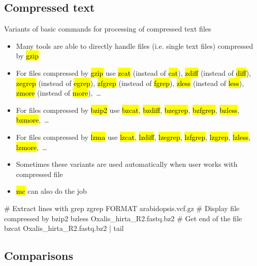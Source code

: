 \documentclass[compress, ucs, xelatex, 11pt, xcolor=svgnames, aspectratio=169,
	hyperref={
		bookmarks=true,
		unicode=true,
		colorlinks=true,
		pdftitle={Linux, command line and MetaCentrum},
		plainpages=false,
		pdfauthor={Vojtech Zeisek},
		pdfsubject={Course about use of Linux command line, writing shell scripts and using MetaCentrum of CESNET},
		pdfcreator={XeLaTeX},
		pdfkeywords={Linux, GNU, BASH, shell, command line, MetaCentrum},
		linkcolor=DarkRed, %
		anchorcolor=DarkBlue, %
		citecolor=Indigo, %
		filecolor=NavyBlue, %
		menucolor=DarkMagenta, %
		urlcolor=DarkBlue, %
		pdftex},
	url={hyphens, lowtilde} %
	]{beamer}
\renewcommand{\texttt}[1]{\hl{\ttfamily #1}}
\begin{document}
\subsection{Compressed text}

\begin{frame}[fragile]{Variants of basic commands for processing of compressed text files}
	\begin{itemize}
		\item Many tools are able to directly handle files (i.e. single text files) compressed by \texttt{gzip}
		\item For files compressed by \texttt{gzip} use \texttt{zcat} (instead of \texttt{cat}), \texttt{zdiff} (instead of \texttt{diff}), \texttt{zegrep} (instead of \texttt{egrep}), \texttt{zfgrep} (instead of \texttt{fgrep}), \texttt{zless} (instead of \texttt{less}), \texttt{zmore} (instead of \texttt{more}),~\ldots
		\item For files compressed by \texttt{bzip2} use \texttt{bzcat}, \texttt{bzdiff}, \texttt{bzegrep}, \texttt{bzfgrep}, \texttt{bzless}, \texttt{bzmore},~\ldots
		\item For files compressed by \texttt{lzma} use \texttt{lzcat}, \texttt{lzdiff}, \texttt{lzegrep}, \texttt{lzfgrep}, \texttt{lzgrep}, \texttt{lzless}, \texttt{lzmore},~\ldots
		\item Sometimes these variants are used automatically when user works with compressed file
		\item \texttt{mc} can also do the job
	\end{itemize}
	\vfill
	\begin{bashcode}
    # Extract lines with grep
    zgrep FORMAT arabidopsis.vcf.gz
    # Display file compressed by bzip2
    bzless Oxalis_hirta_R2.fastq.bz2
    # Get end of the file
    bzcat Oxalis_hirta_R2.fastq.bz2 | tail
	\end{bashcode}
\end{frame}

\subsection{Comparisons}
\end{document}
